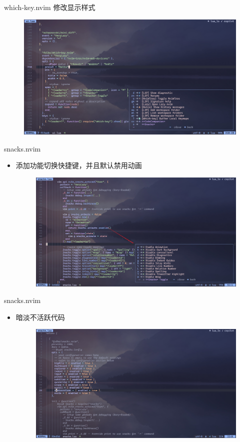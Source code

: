 \documentclass[aspectratio=169]{ctexbeamer}
\begin{document}
  \begin{frame}{which-key.nvim}
    修改显示样式

    \begin{figure}[H]
      \centering
      \includegraphics[width=0.7\linewidth]{./Figures/Which-key_Config.jpg}
    \end{figure}

  \end{frame}

  \begin{frame}{snacks.nvim}
    \begin{itemize}
      \item 添加功能切换快捷键，并且默认禁用动画
        \begin{figure}[H]
          \centering
          \includegraphics[width=0.7\linewidth]{./Figures/Snacks_Config_1_Toggle.jpg}
        \end{figure}
    \end{itemize}
  \end{frame}

  \begin{frame}{snacks.nvim}
    \begin{itemize}
      \item 暗淡不活跃代码 %
        \begin{figure}[H]
          \centering
          \includegraphics[width=0.7\linewidth]{./Figures/Snacks_Config_2_Dim.jpg}
        \end{figure}
    \end{itemize}
  \end{frame}
\end{document}

